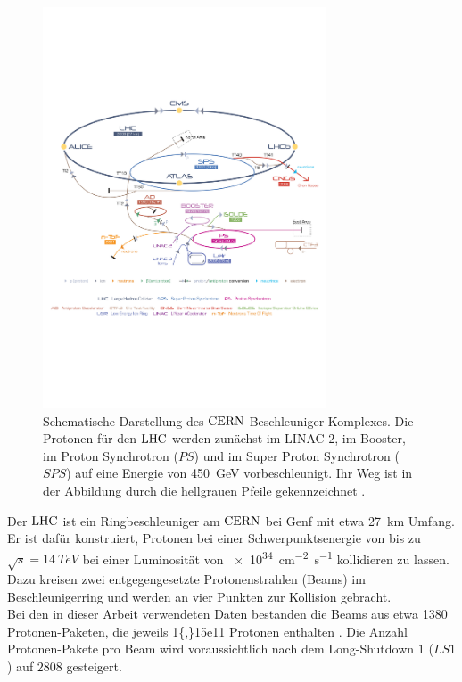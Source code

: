 \begin{figure}[htpb]
	\centering
		\includegraphics[width=0.75\textwidth]{fig/cern_scheme.pdf}
	\caption{Schematische Darstellung des $\mbox{CERN}$-Beschleuniger Komplexes. Die Protonen für den $\mbox{LHC}$ werden zunächst im LINAC 2, im Booster, im Proton Synchrotron ($P\!S$) und im Super Proton Synchrotron ($S\!P\!S$) auf eine Energie von \SI{450}{GeV} vorbeschleunigt. Ihr Weg ist in der Abbildung durch die hellgrauen Pfeile gekennzeichnet \cite{cern_scheme}.}
	\label{fig:cern_scheme} 
\end{figure} 
Der $\mbox{LHC}$ ist ein Ringbeschleuniger am $\mbox{CERN}$ bei Genf mit etwa \SI{27}{km} Umfang. Er ist dafür konstruiert, Protonen bei einer Schwerpunktsenergie von bis zu $\sqrt{s}=\SI{14}{TeV}$ bei einer Luminosität von \SI{e34}{cm^{-2}s^{-1}} \cite{lhc_design} kollidieren zu lassen. Dazu kreisen zwei entgegengesetzte Protonenstrahlen (Beams) im Beschleunigerring und werden an vier Punkten zur Kollision gebracht. \\
Bei den in dieser Arbeit verwendeten Daten bestanden die Beams aus etwa \num{1380} Protonen-Paketen, die jeweils \num{1{,}15e11} Protonen enthalten \cite{LHC_statistik}. Die Anzahl Pro\-tonen-Pakete pro Beam wird voraussichtlich nach dem Long-Shutdown $1$ ($L\!S1$) auf $2808$ \cite{lhc_design} gesteigert. \\
